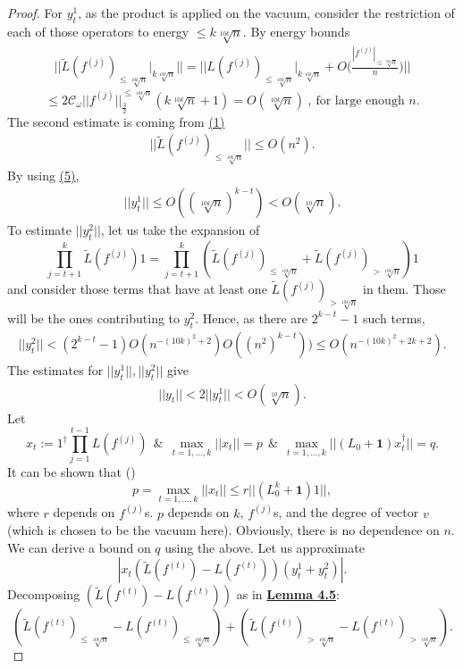 \documentclass[twoside,11pt,titlepage]{amsart}
\renewcommand{\=}[1]{\stackrel{#1}{=}} %
\theoremstyle{definition}
\theoremstyle{remark}
\begin{document}
\begin{proof}
For $y_t^1$, as the product is applied on the vacuum, consider the restriction of each of those operators to energy $\le k\sqrt[10k]{n}$. By energy bounds
\begin{align}\label{eq5}
||\widetilde{L}(f^{(j)})_{\le \sqrt[10k]{n}}\Big|_{k\sqrt[10k]{n}}|| = ||L(f^{(j)})_{\le \sqrt[10k]{n}}\Big|_{k\sqrt[10k]{n}} + O\Big(\frac{|f^{(j)}|_{\le \sqrt[10k]{n}}}{n} \Big) || 
\end{align}
$$ \le 2\mathcal{C}_\omega||f^{(j)}||_{\frac{3}{2}}^{\le \sqrt[10k]{n}}(k\sqrt[10k]{n}+1)=O(\sqrt[10k]{n}) \ , \ \text{for large enough } n. $$
The second estimate is coming from \hyperref[eq1]{(1)}
\begin{align}\label{eq6}
||\widetilde{L}(f^{(j)})_{\le \sqrt[10k]{n}}|| \le O(n^2).
\end{align}
By using \hyperref[eq5]{(5)},
\begin{align}\label{eq7}
||y_t^1|| \le O((\sqrt[10k]{n})^{k-t})<O(\sqrt[10]{n}).
\end{align}
To estimate $||y_t^2||$, let us take the expansion of 
$$\prod_{j=t+1}^{k} \widetilde{L}(f^{(j)})1=\prod_{j=t+1}^{k} (\widetilde{L}(f^{(j)})_{\le \sqrt[10k]{n}}+\widetilde{L}(f^{(j)})_{> \sqrt[10k]{n}})1$$
and consider those terms that have at least one $\widetilde{L}(f^{(j)})_{> \sqrt[10k]{n}}$ in them. Those will be the ones contributing to $y_t^2$. Hence, as there are $2^{k-t}-1$ such terms,
\begin{align}\label{eq8}
||y_t^2|| < (2^{k-t}-1) O(n^{-(10k)^2+2})  O((n^2)^{k-t})) \le O(n^{-(10k)^2+2k+2}).
\end{align}
The estimates for $||y_t^1||,||y_t^2||$ give
\begin{align}\label{eq9}
||y_t|| < 2||y_t^1|| < O(\sqrt[10]{n}).
\end{align}
Let
$$x_t:=1^\dagger\prod_{j=1}^{t-1} L(f^{(j)})\ \ \& \ \ \max\limits_{t=1,\ldots,k}||x_t||=p \ \ \& \ \ \max\limits_{t=1,\ldots,k}||(L_0+\textbf{1})x_t^\dagger||=q.$$
It can be shown that (\cite[Lemma 3.2.1]{weiner2007conformal})
$$p=\max\limits_{t=1,\ldots,k}||x_t|| \le r||(L_0^k+\textbf{1})1||, $$
where $r$ depends on $f^{(j)}$s. $p$ depends on $k$, $f^{(j)}$s, and the degree of vector $v$ (which is chosen to be the vacuum here). Obviously, there is no dependence on $n$. We can derive a bound on $q$ using the above. Let us approximate
$$ |x_t(\widetilde{L}(f^{(t)})-L(f^{(t)}))(y_t^1+y_t^2)|.$$
Decomposing $(\widetilde{L}(f^{(t)})-L(f^{(t)}))$ as in \hyperref[lem4.5]{\textbf{Lemma 4.5}}:
$$(\widetilde{L}(f^{(t)})_{\le \sqrt[10k]{n}}-L(f^{(t)})_{\le \sqrt[10k]{n}})  + (\widetilde{L}(f^{(t)})_{>\sqrt[10k]{n}}-L(f^{(t)})_{>\sqrt[10k]{n}}). $$

\end{proof}
\end{document}
